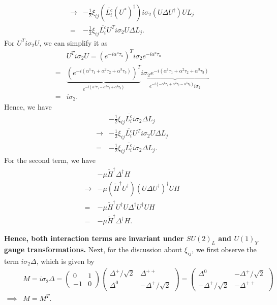 \begin{itemize}
\begin{align}
        \to& -\frac{1}{2}\xi_{ij} (\overline{L_i^c} (U^*)^\dagger)  i \sigma_2 (U  \Delta  U^\dagger) U L_j\\
        =& -\frac{1}{2}\xi_{ij} \overline{L_i^c} U^T  i \sigma_2 U \Delta  L_j.
    \end{align}
    For $ U^T  i \sigma_2 U$, we can simplify it as 
    \begin{align}
       &U^T  i \sigma_2 U =( e^{-i \alpha^a \tau_a})^T i\sigma_2 e^{-i \alpha^a \tau_a} \\
       =&\underbrace{( e^{-i (\alpha^1\tau_1+\alpha^2\tau_2+\alpha^3\tau_3)})^T}_{e^{-i (\alpha^1\tau_1-\alpha^2\tau_2+\alpha^3\tau_3)}} \underbrace{i\sigma_2 e^{-i (\alpha^1\tau_1+\alpha^2\tau_2+\alpha^3\tau_3)}}_{e^{-i (-\alpha^1\tau_1+\alpha^2\tau_2-\alpha^3\tau_3)} i \sigma_2}\\
       =&i\sigma_2.
    \end{align}
    Hence, we have 
    \begin{align}
        &-\frac{1}{2}\xi_{ij} \overline{L_i^c} i\sigma_2 \Delta L_j\\
        \to&-\frac{1}{2}\xi_{ij} \overline{L_i^c} U^T  i \sigma_2 U \Delta  L_j \\
        =&-\frac{1}{2}\xi_{ij} \overline{L_i^c} i\sigma_2 \Delta L_j.
    \end{align}
    For the second term, we have 
    \begin{align}
        &-\mu \tilde{H}^\dagger\Delta^\dagger H\\
        \to&-\mu  (\tilde{H}^\dagger U^\dagger) (U \Delta U^\dagger)^\dagger U H\\
        =& -\mu \tilde{H}^\dagger U^\dagger U \Delta^\dagger U^\dagger  U H\\
        =&-\mu \tilde{H}^\dagger\Delta^\dagger H.
    \end{align}
\end{itemize}
\textbf{Hence, both interaction terms are invariant under $SU(2)_L$ and $U(1)_Y$ gauge transformations.} Next, for the discussion about $\xi_{ij}$, we first observe the term $i\sigma_2 \Delta$, which is given by 
\begin{align}
    &M=i\sigma_2 \Delta = 
    \begin{pmatrix}
    0&1\\
    -1&0    
    \end{pmatrix}\begin{pmatrix}
    \Delta^+/\sqrt{2}& \Delta^{++}\\
    \Delta^0         & -\Delta^{+}/\sqrt{2}    
    \end{pmatrix}=\begin{pmatrix}
    \Delta^0& -\Delta^{+}/\sqrt{2}   \\
    -\Delta^+/\sqrt{2}         & -\Delta^{++}    
    \end{pmatrix}\\
    \implies& M=M^T.
\end{align}
